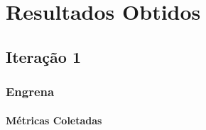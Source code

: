 \chapter{Resultados Obtidos}

\section{Iteração 1}

\subsection{Engrena}

\subsubsection{Métricas Coletadas}

